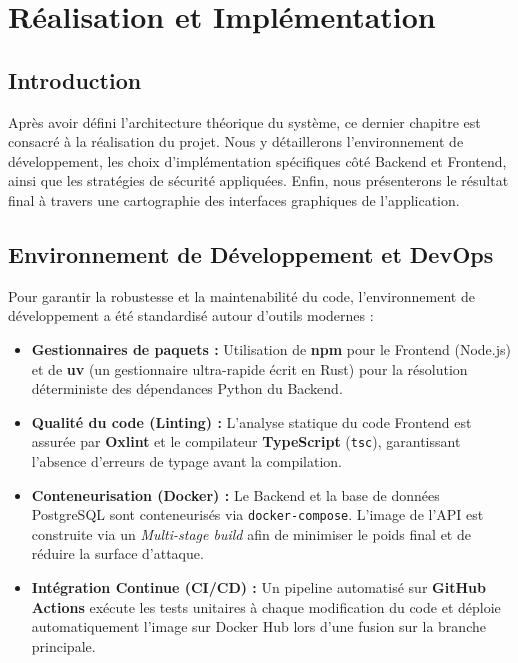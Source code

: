 \chapter{Réalisation et Implémentation}
\label{chap:realisation}

\section*{Introduction}
Après avoir défini l'architecture théorique du système, ce dernier chapitre est consacré à la réalisation du projet. Nous y détaillerons l'environnement de développement, les choix d'implémentation spécifiques côté Backend et Frontend, ainsi que les stratégies de sécurité appliquées. Enfin, nous présenterons le résultat final à travers une cartographie des interfaces graphiques de l'application.

\section{Environnement de Développement et DevOps}
Pour garantir la robustesse et la maintenabilité du code, l'environnement de développement a été standardisé autour d'outils modernes :

\begin{itemize}
    \item \textbf{Gestionnaires de paquets :} Utilisation de \textbf{npm} pour le Frontend (Node.js) et de \textbf{uv} (un gestionnaire ultra-rapide écrit en Rust) pour la résolution déterministe des dépendances Python du Backend.
    \item \textbf{Qualité du code (Linting) :} L'analyse statique du code Frontend est assurée par \textbf{Oxlint} et le compilateur \textbf{TypeScript} (\texttt{tsc}), garantissant l'absence d'erreurs de typage avant la compilation.
    \item \textbf{Conteneurisation (Docker) :} Le Backend et la base de données PostgreSQL sont conteneurisés via \texttt{docker-compose}. L'image de l'API est construite via un \textit{Multi-stage build} afin de minimiser le poids final et de réduire la surface d'attaque.
    \item \textbf{Intégration Continue (CI/CD) :} Un pipeline automatisé sur \textbf{GitHub Actions} exécute les tests unitaires à chaque modification du code et déploie automatiquement l'image sur Docker Hub lors d'une fusion sur la branche principale.
\end{itemize}

